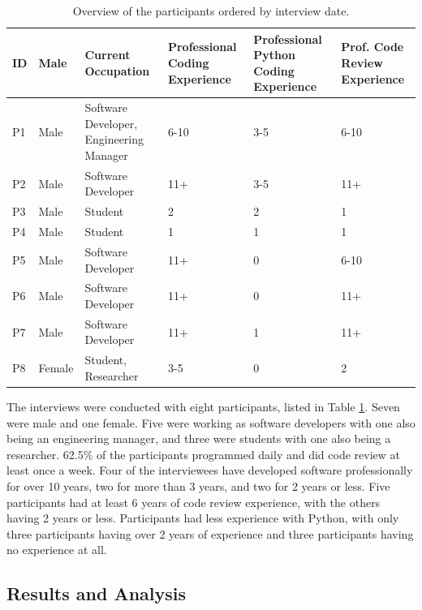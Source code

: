\documentclass[a4paper,11pt,twoside]{article}
\theoremstyle{definition} %
\begin{document}
\begin{table}[h!]
\begin{center}
\begin{tabular}{ m{1cm} | m{1.5cm} |  m{3.5cm} | m{2cm} | m{2cm} | m{2cm} } 
 \rowcolor{lightgray} ID & Male & Current Occupation & Professional Coding Experience & Professional Python Coding Experience & Prof. Code Review Experience \\
 \hline
 P1 & Male & Software Developer, Engineering Manager & 6-10 & 3-5 & 6-10 \\
 
 P2 & Male & Software Developer & 11+ & 3-5 & 11+ \\
 
 P3 & Male & Student & 2 & 2 & 1 \\
 
 P4 & Male & Student & 1 & 1 & 1 \\
 
 P5 & Male & Software Developer & 11+ & 0 & 6-10 \\
 
 P6 & Male & Software Developer & 11+ & 0 & 11+ \\
 
 P7 & Male & Software Developer & 11+ & 1 & 11+ \\
 
 P8 & Female & Student, Researcher & 3-5 & 0 & 2 \\
\end{tabular}
\end{center}
\caption{Overview of the participants ordered by interview date.}
\label{table:ParticipantsOverview}
\end{table}

The interviews were conducted with eight participants, listed in Table \ref{table:ParticipantsOverview}. Seven were male and one female. Five were working as software developers with one also being an engineering manager, and three were students with one also being a researcher. 62.5\% of the participants programmed daily and did code review at least once a week. Four of the interviewees have developed software professionally for over 10 years, two for more than 3 years, and two for 2 years or less. Five participants had at least 6 years of code review experience, with the others having 2 years or less. Participants had less experience with Python, with only three participants having over 2 years of experience and three participants having no experience at all.


\subsection{Results and Analysis} \label{SubSec:ResultsAnalysis}
\end{document}
